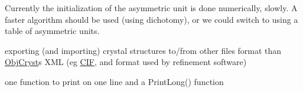 
\begin{DoxyRefList}
\item[Class \mbox{\hyperlink{class_obj_cryst_1_1_asymmetric_unit}{Obj\+Cryst::Asymmetric\+Unit}} ]\label{todo__todo000013}%
%
Currently the initialization of the asymmetric unit is done numerically, slowly. A faster algorithm should be used (using dichotomy), or we could switch to using a table of asymmetric units.  
\item[Class \mbox{\hyperlink{class_obj_cryst_1_1_crystal}{Obj\+Cryst::Crystal}} ]\label{todo__todo000001}%
%
exporting (and importing) crystal structures to/from other files format than \mbox{\hyperlink{namespace_obj_cryst}{Obj\+Cryst}}\textquotesingle{}s X\+ML (eg \mbox{\hyperlink{class_obj_cryst_1_1_c_i_f}{C\+IF}}, and format used by refinement software) 
\item[Member \mbox{\hyperlink{class_obj_cryst_1_1_crystal_a086f39272ca94c23ff7819151a9edf37}{Obj\+Cryst::Crystal::Print}} (ostream \&os=cout) const]\label{todo__todo000002}%
%
one function to print on one line and a Print\+Long() function  
\item[Member \mbox{\hyperlink{class_obj_cryst_1_1_diffraction_data_single_crystal_a4de874f4ad2ab26bec50a30eef048f01}{Obj\+Cryst::Diffraction\+Data\+Single\+Crystal::Get\+Icalc\+\_\+\+Full\+Deriv}} (std\+::set$<$ Refinable\+Par $\ast$ $>$ \&v\+Par)]\label{todo__todo000003}%
%
 

\end{DoxyRefList}
